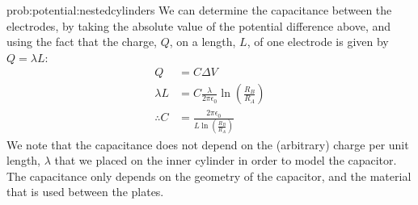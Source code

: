 \begin{solution}{prob:potential:nestedcylinders}
We can determine the capacitance between the electrodes, by taking the absolute value of the potential difference above, and using the fact that the charge, $Q$, on a length, $L$, of one electrode is given by $Q=\lambda L$:
\begin{align*}
Q &= C\Delta V\\
\lambda L &= C\frac{\lambda }{2\pi \epsilon_0}\ln\left( \frac{R_B}{R_A} \right)\\
\therefore C&=\frac{2\pi \epsilon_0}{L\ln\left( \frac{R_B}{R_A} \right)}
\end{align*}
We note that the capacitance does not depend on the (arbitrary) charge per unit length, $\lambda$ that we placed on the inner cylinder in order to model the capacitor. The capacitance only depends on the geometry of the capacitor, and the material that is used between the plates.
\end{solution}
